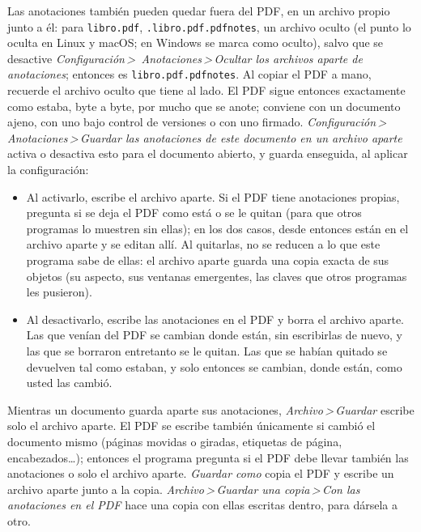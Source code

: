 \documentclass[12pt,
              article,
              oneside
              ]{memoir}
\newcommand*{\menu}[1]{\textit{#1}}
\newcommand*{\then}{\,>\,}
\begin{document}
%
Las anotaciones también pueden quedar fuera del PDF, en un archivo propio
junto a él: para \texttt{libro.pdf}, \texttt{.libro.pdf.pdfnotes}, un
archivo oculto (el punto lo oculta en Linux y macOS; en Windows se marca
como oculto), salvo que se desactive \menu{Configuración\then
Anotaciones\then Ocultar los archivos aparte de anotaciones}; entonces es
\texttt{libro.pdf.pdfnotes}. Al copiar el PDF a mano, recuerde el archivo
oculto que tiene al lado. El PDF sigue entonces exactamente como estaba, byte a byte, por mucho que se
anote; conviene con un documento ajeno, con uno bajo control de versiones
o con uno firmado. \menu{Configuración\then Anotaciones\then Guardar las
anotaciones de este documento en un archivo aparte} activa o desactiva esto
para el documento abierto, y guarda enseguida, al aplicar la configuración:

\begin{itemize}
\item Al activarlo, escribe el archivo aparte. Si el PDF tiene anotaciones
  propias, pregunta si se deja el PDF como está o se le quitan (para que
  otros programas lo muestren sin ellas); en los dos casos, desde entonces
  están en el archivo aparte y se editan allí. Al quitarlas, no se reducen
  a lo que este programa sabe de ellas: el archivo aparte guarda una copia
  exacta de sus objetos (su aspecto, sus ventanas emergentes, las claves
  que otros programas les pusieron).
\item Al desactivarlo, escribe las anotaciones en el PDF y borra el
  archivo aparte. Las que venían del PDF se cambian donde están, sin
  escribirlas de nuevo, y las que se borraron entretanto se le quitan.
  Las que se habían quitado se devuelven tal como estaban, y solo
  entonces se cambian, donde están, como usted las cambió.
\end{itemize}

\noindent Mientras un documento guarda aparte sus anotaciones,
\menu{Archivo\then Guardar} escribe solo el archivo aparte. El PDF se
escribe también únicamente si cambió el documento mismo (páginas movidas o
giradas, etiquetas de página, encabezados\ldots); entonces el programa
pregunta si el PDF debe llevar también las anotaciones o solo el archivo
aparte. \menu{Guardar como} copia el PDF y escribe un archivo aparte junto
a la copia. \menu{Archivo\then Guardar una copia\then Con las anotaciones
en el PDF} hace una copia con ellas escritas dentro, para dársela a otro.
\end{document}
